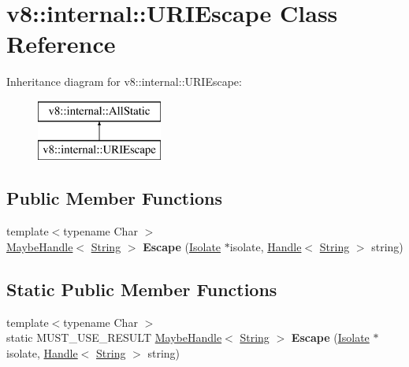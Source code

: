 \hypertarget{classv8_1_1internal_1_1_u_r_i_escape}{}\section{v8\+:\+:internal\+:\+:U\+R\+I\+Escape Class Reference}
\label{classv8_1_1internal_1_1_u_r_i_escape}
Inheritance diagram for v8\+:\+:internal\+:\+:U\+R\+I\+Escape\+:\begin{figure}[H]
\begin{center}
\leavevmode
\includegraphics[height=2.000000cm]{classv8_1_1internal_1_1_u_r_i_escape}
\end{center}
\end{figure}
\subsection*{Public Member Functions}
\begin{DoxyCompactItemize}
\item 
{\footnotesize template$<$typename Char $>$ }\\\hyperlink{classv8_1_1internal_1_1_maybe_handle}{Maybe\+Handle}$<$ \hyperlink{classv8_1_1internal_1_1_string}{String} $>$ {\bfseries Escape} (\hyperlink{classv8_1_1internal_1_1_isolate}{Isolate} $\ast$isolate, \hyperlink{classv8_1_1internal_1_1_handle}{Handle}$<$ \hyperlink{classv8_1_1internal_1_1_string}{String} $>$ string)\hypertarget{classv8_1_1internal_1_1_u_r_i_escape_a23519a808847f598bfbe9adb20bff0bb}{}\label{classv8_1_1internal_1_1_u_r_i_escape_a23519a808847f598bfbe9adb20bff0bb}

\end{DoxyCompactItemize}
\subsection*{Static Public Member Functions}
\begin{DoxyCompactItemize}
\item 
{\footnotesize template$<$typename Char $>$ }\\static M\+U\+S\+T\+\_\+\+U\+S\+E\+\_\+\+R\+E\+S\+U\+LT \hyperlink{classv8_1_1internal_1_1_maybe_handle}{Maybe\+Handle}$<$ \hyperlink{classv8_1_1internal_1_1_string}{String} $>$ {\bfseries Escape} (\hyperlink{classv8_1_1internal_1_1_isolate}{Isolate} $\ast$isolate, \hyperlink{classv8_1_1internal_1_1_handle}{Handle}$<$ \hyperlink{classv8_1_1internal_1_1_string}{String} $>$ string)\hypertarget{classv8_1_1internal_1_1_u_r_i_escape_aac6157301228918a3dd52ac61502b8a8}{}\label{classv8_1_1internal_1_1_u_r_i_escape_aac6157301228918a3dd52ac61502b8a8}

\end{DoxyCompactItemize}

